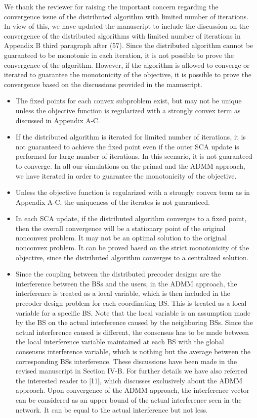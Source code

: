 \begin{enumerate}
\resp We thank the reviewer for raising the important concern regarding the convergence issue of the distributed algorithm with limited number of iterations. In view of this, we have updated the manuscript to include the discussion on the convergence of the distributed algorithms with limited number of iterations in Appendix B third paragraph after (57). Since the distributed algorithm cannot be guaranteed to be monotonic in each iteration, it is not possible to prove the convergence of the algorithm. However, if the algorithm is allowed to converge or iterated to guarantee the monotonicity of the objective, it is possible to prove the convergence based on the discussions provided in the manuscript. 
\begin{itemize}
\item The fixed points for each convex subproblem exist, but may not be unique unless the objective function is regularized with a strongly convex term as discussed in Appendix A-C.
\item If the distributed algorithm is iterated for limited number of iterations, it is not guaranteed to achieve the fixed point even if the outer \ac{SCA} update is performed for large number of iterations. In this scenario, it is not guaranteed to converge. In all our simulations on the primal and the \ac{ADMM} approach, we have iterated  in order to guarantee the monotonicity of the objective.
\item Unless the objective function is regularized with a strongly convex term as in Appendix A-C, the uniqueness of the iterates is not guaranteed. 
\item In each \ac{SCA} update, if the distributed algorithm converges to a fixed point, then the overall convergence will be a stationary point of the original nonconvex problem. It may not be an optimal solution to the original nonconvex problem. It can be proved based on the strict monotonicity of the objective, since the distributed algorithm converges to a centralized solution.
\item Since the coupling between the distributed precoder designs are the interference between the BSs and the users, in the \ac{ADMM} approach, the interference is treated as a local variable, which is then included in the precoder design problem for each coordinating BS. This is treated as a local variable for a specific BS. Note that the local variable is an assumption made by the BS on the actual interference caused by the neighboring BSs. Since the actual interference caused is different, the consensus has to be made between the local interference variable maintained at each BS with the global consensus interference variable, which is nothing but the average between the corresponding BSs interference. These discussions have been made in the revised manuscript in Section IV-B. For further details we have also referred the interested reader to [11], which discusses exclusively about the ADMM approach. Upon convergence of the \ac{ADMM} approach, the interference vector can be considered as an upper bound of the actual interference seen in the network. It can be equal to the actual interference but not less.
\end{itemize}

\end{enumerate}

